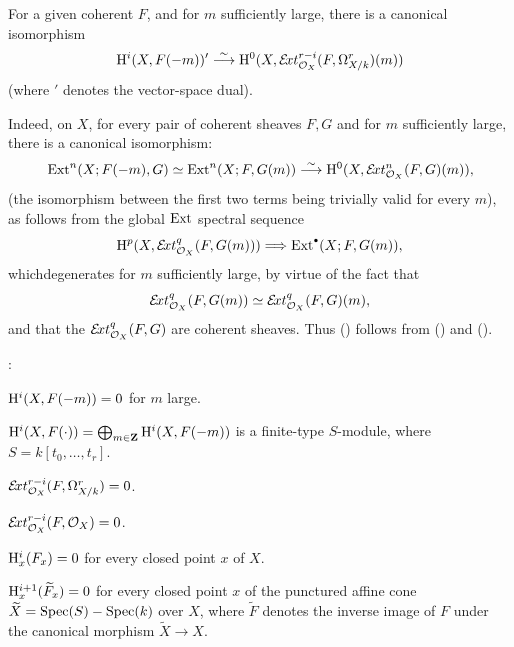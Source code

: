 \begin{corollaire} \label{XII.1.2} For a given coherent $F$, and for $m$ sufficiently large, there is a canonical isomorphism
\steco
\begin{equation} \label{eq:XII.5} {}\mathrm H^i(X, F(-m))'\overset{\sim}{\longrightarrow}\mathrm H^0(X, \mathcal E\!xt_{\mathcal O_X}^{r-i}(F, \Omega_{X/k}^r)(m))
\end{equation}
(where $'$ denotes the vector-space dual).
\end{corollaire}
Indeed, on  $X$, for every pair of coherent sheaves $F,G$ and for $m$ sufficiently large, there is a canonical isomorphism:
\steco
\begin{equation} \label{eq:XII.6} {}\operatorname{Ext}^n(X;F(-m), G)\simeq \operatorname{Ext}^n(X;F, G(m)) \overset{\sim}{\longrightarrow} \mathrm H^0(X, \mathcal E\!xt_{\mathcal O_X}^{n}(F, G)(m)),
\end{equation}
(the isomorphism between the first two terms being trivially valid for every $m$), as follows from the global $\operatorname{Ext}$ spectral sequence
\[
\H^p(X, \SheafExt^q_{\OX}(F, G(m))) \To \Ext^{\boule}(X;F, G(m)),
\]
which\pageoriginale degenerates for $m$ sufficiently large, by virtue of the fact that
\[
\mathcal E\!xt^q_{\mathcal O_X}(F, G(m)) \simeq \mathcal E\!xt^q_{\mathcal O_X}(F, G)(m),
\]
and that the $\mathcal E\!xt^q_{\mathcal O_X}(F, G)$ are coherent sheaves. Thus () follows from () and ().

\begin{corollaire} \label{XII.1.3}
:
\begin{enumeratei}
\item
$\mathrm H^i(X, F(-m))=0$ for $m$ large.
\item[\textup{(i bis)}] $\mathrm H^i(X, F(\cdot))= \bigoplus_{m\in\mathbf Z}\mathrm H^i(X, F(-m))$ is a finite-type $S$-module, where $S=k[t_0, \ldots, t_r]$.
\item
$\mathcal E\!xt^{r-i}_{\mathcal O_X}(F, \Omega_{X/k}^r)=0$.
\item[\textup{(ii bis)}] $\mathcal E\!xt^{r-i}_{\mathcal O_X}(F, \mathcal O_X)=0$.
\item
$\mathrm H^i_x(F_x)=0$ for every closed point $x$ of $X$.
\item
$\mathrm H^{i+1}_x(\widetilde{F}_x)=0$ for every closed point $x$ of the punctured affine cone $\widetilde{X}=\operatorname{Spec}(S)-\operatorname{Spec}(k)$ over $X$, where $\widetilde{F}$ denotes the inverse image of $F$ under the canonical morphism $\widetilde{X}\to X$.
\end{enumeratei}
\end{corollaire}

